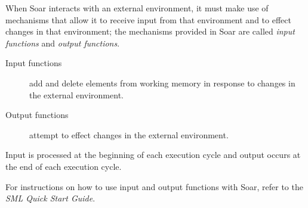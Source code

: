 When Soar interacts with an external environment, it must make use of
mechanisms that allow it to receive input from that environment and to effect
changes in that environment; the mechanisms provided in Soar are called
\textit{input functions} and \textit{output functions}.

\begin{description}
\item[Input functions] add and delete elements from working memory in response
	to changes in the external environment.
\item[Output functions] attempt to effect changes in the external
	environment. 
\end{description}

Input is processed at the beginning of each execution cycle and output
occurs at the end of each execution cycle.

For instructions on how to use input and output functions with Soar, refer to the
\textit{SML Quick Start Guide}.




